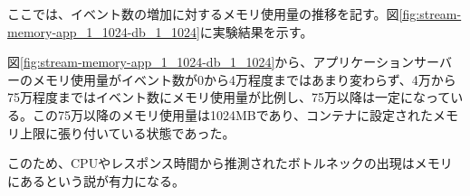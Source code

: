 \documentclass[../../../../../main]{subfiles}
\begin{document}
    \label{subsubsec:result-streaming-only-limit-memory}

    ここでは、イベント数の増加に対するメモリ使用量の推移を記す。図\ref{fig:stream-memory-app_1_1024-db_1_1024}に実験結果を示す。

    

    図\ref{fig:stream-memory-app_1_1024-db_1_1024}から、アプリケーションサーバーのメモリ使用量がイベント数が0から4万程度まではあまり変わらず、4万から75万程度まではイベント数にメモリ使用量が比例し、75万以降は一定になっている。この75万以降のメモリ使用量は1024MBであり、コンテナに設定されたメモリ上限に張り付いている状態であった。

    このため、CPUやレスポンス時間から推測されたボトルネックの出現はメモリにあるという説が有力になる。
\end{document}
